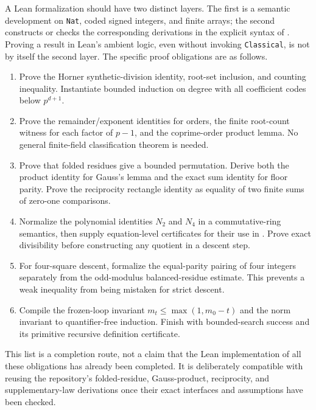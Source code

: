 A Lean formalization should have two distinct layers.  The first is a
semantic development on \texttt{Nat}, coded signed integers, and finite
arrays; the second constructs or checks the corresponding derivations
in the explicit syntax of \ipra. Proving a result in Lean's ambient
logic, even without invoking \texttt{Classical}, is not by itself the
second layer. The specific proof obligations are as follows.
\begin{enumerate}
\item Prove the Horner synthetic-division identity, root-set inclusion,
and counting inequality. Instantiate bounded induction on degree with
all coefficient codes below $p^{d+1}$.
\item Prove the remainder/exponent identities for orders, the finite
root-count witness for each factor of $p-1$, and the coprime-order product
lemma. No general finite-field classification theorem is needed.
\item Prove that folded residues give a bounded permutation. Derive
both the product identity for Gauss's lemma and the exact sum identity
for floor parity. Prove the reciprocity rectangle identity as equality
of two finite sums of zero-one comparisons.
\item Normalize the polynomial identities $N_2$ and $N_4$ in a
commutative-ring semantics, then supply equation-level certificates
for their use in \ipra. Prove exact divisibility before constructing
any quotient in a descent step.
\item For four-square descent, formalize the equal-parity pairing of
four integers separately from the odd-modulus balanced-residue estimate.
This prevents a weak inequality from being mistaken for strict descent.
\item Compile the frozen-loop invariant
$m_t\le\max(1,m_0-t)$ and the norm invariant to quantifier-free
induction. Finish with bounded-search success and its primitive
recursive definition certificate.
\end{enumerate}
This list is a completion route, not a claim that the Lean implementation
of all these obligations has already been completed. It is deliberately
compatible with reusing the repository's folded-residue, Gauss-product,
reciprocity, and supplementary-law derivations once their exact interfaces
and assumptions have been checked.
